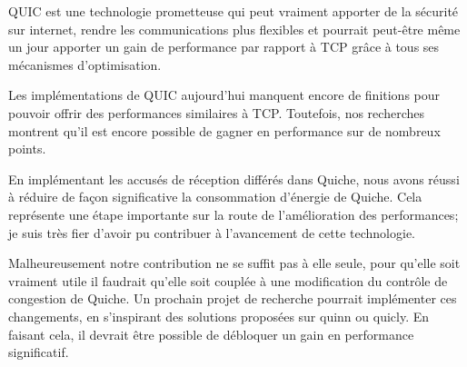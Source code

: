 QUIC est une technologie prometteuse qui peut vraiment apporter de la sécurité sur internet, rendre les communications plus flexibles et pourrait peut-être même un jour apporter un gain de performance par rapport à TCP grâce à tous ses mécanismes d'optimisation.

Les implémentations de QUIC aujourd'hui manquent encore de finitions pour pouvoir offrir des performances similaires à TCP.
Toutefois, nos recherches montrent qu'il est encore possible de gagner en performance sur de nombreux points.

\vspace{0.5cm}

En implémentant les accusés de réception différés dans Quiche, nous avons réussi à réduire de façon significative la consommation d'énergie de Quiche. Cela représente une étape importante sur la route de l'amélioration des performances; je suis très fier d'avoir pu contribuer à l'avancement de cette technologie.

Malheureusement notre contribution ne se suffit pas à elle seule, pour qu'elle soit vraiment utile il faudrait qu'elle soit couplée à une modification du contrôle de congestion de Quiche. Un prochain projet de recherche pourrait implémenter ces changements, en s'inspirant des solutions proposées sur quinn ou quicly. En faisant cela, il devrait être possible de débloquer un gain en performance significatif.